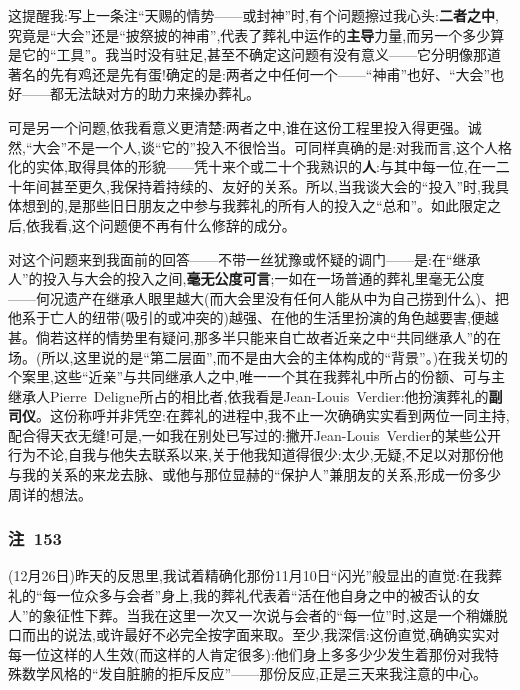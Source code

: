 这提醒我:写上一条注“天赐的情势——或封神”时,有个问题擦过我心头:\textbf{二者之中},究竟是“大会”还是“披祭披的神甫”,代表了葬礼中运作的\textbf{主导}力量,而另一个多少算是它的“工具”。我当时没有驻足,甚至不确定这问题有没有意义——它分明像那道著名的先有鸡还是先有蛋!确定的是:两者之中任何一个——“神甫”也好、“大会”也好——都无法缺对方的助力来操办葬礼\dmark{}。

可是另一个问题,依我看意义更清楚:两者之中,谁在这份工程里投入得更强。诚然,“大会”不是一个人,谈“它的”投入不很恰当。可同样真确的是:对我而言,这个人格化的实体,取得具体的形貌——凭十来个或二十个我熟识的\textbf{人}:与其中每一位,在一二十年间甚至更久,我保持着持续的、友好的关系。所以,当我谈大会的“投入”时,我具体想到的,是那些旧日朋友之中参与我葬礼的所有人的投入之“总和”。如此限定之后,依我看,这个问题便不再有什么修辞的成分。

对这个问题来到我面前的回答——不带一丝犹豫或怀疑的调门——是:在“继承人”的投入与大会的投入之间,\textbf{毫无公度可言};一如在一场普通的葬礼里毫无公度——何况遗产在继承人眼里越大(而大会里没有任何人能从中为自己捞到什么)、把他系于亡人的纽带(吸引的或冲突的)越强、在他的生活里扮演的角色越要害,便越甚。倘若这样的情势里有疑问,那多半只能来自亡故者近亲之中“共同继承人”的在场。(所以,这里说的是“第二层面”,而不是由大会的主体构成的“背景”。)在我关切的个案里,这些“近亲”与共同继承人之中,唯一一个其在我葬礼中所占的份额、可与主继承人Pierre~Deligne所占的相比者,依我看是Jean-Louis~Verdier:他扮演葬礼的\textbf{副司仪}。这份称呼并非凭空:在葬礼的进程中,我不止一次确确实实看到两位一同主持,配合得天衣无缝!可是,一如我在别处已写过的:撇开Jean-Louis~Verdier的某些公开行为不论,自我与他失去联系以来,关于他我知道得很少:太少,无疑,不足以对那份他与我的关系的来龙去脉、或他与那位显赫的“保护人”兼朋友的关系,形成一份多少周详的想法。

\subsubsection*{注~153}

\label{ch18:local:n61}

(12月26日)昨天的反思里,我试着精确化那份11月10日“闪光”般显出的直觉:在我葬礼的“每一位众多与会者”身上,我的葬礼代表着“活在他自身之中的被否认的女人”的象征性下葬\dmark{}。当我在这里一次又一次说与会者的“每一位”时,这是一个稍嫌脱口而出的说法,或许最好不必完全按字面来取。至少,我深信:这份直觉,确确实实对每一位这样的人生效(而这样的人肯定很多):他们身上多多少少发生着那份对我特殊数学风格的“发自脏腑的拒斥反应”——那份反应,正是三天来我注意的中心。


